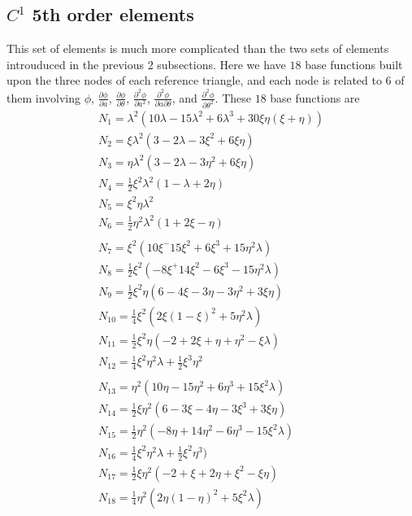 \documentclass{report}
\newcommand{\ff}[2]{\frac{#1}{#2}}
\newcommand{\pp}[2]{\frac{\partial{#1}}{\partial{#2}}}
\newcommand{\psp}[2]{\frac{\partial^2{#1}}{\partial{#2}^2}}
\newcommand{\ppp}[3]{\frac{\partial^2{#1}}{\partial{#2}\partial{#3}}}
\begin{document}
\subsection{$C^1$ 5th order elements}
\label{sec:e5}
This set of elements is much more complicated than the two sets of elements 
introuduced in the previous 2 subsections. Here we have $18$ base functions
built upon the three nodes of each reference triangle,
and each node is related to $6$ of them involving 
$\phi$, 
$\pp{\phi}{a}$,
$\pp{\phi}{\theta}$,
$\psp{\phi}{a}$,
$\ppp{\phi}{a}{\theta}$,
and $\psp{\phi}{\theta}$.
These $18$ base functions are
\begin{equation}
\begin{array}{l}
N_1 = \lambda^2(10\lambda - 15\lambda^2 + 6\lambda^3 + 30\xi\eta(\xi + \eta)) \\
N_2 = \xi \lambda^2(3 - 2\lambda - 3\xi^2  + 6\xi\eta) \\
N_3 = \eta\lambda^2(3 - 2\lambda - 3\eta^2 + 6\xi\eta) \\
N_4 = \ff{1}{2} \xi^2\lambda^2(1 - \lambda + 2\eta) \\
N_5 = \xi^2\eta\lambda^2 \\
N_6 = \ff{1}{2} \eta^2\lambda^2(1 + 2\xi - \eta) \\
\\
N_7 = \xi^2(10\xi^ - 15\xi^2 + 6\xi^3 + 15\eta^2\lambda) \\
N_8 = \ff{1}{2}\xi^2(-8\xi^ + 14\xi^2 - 6\xi^3 - 15\eta^2\lambda) \\
N_9 = \ff{1}{2}\xi^2\eta(6 - 4\xi - 3\eta - 3\eta^2 + 3\xi\eta) \\
N_{10} = \ff{1}{4}\xi^2(2\xi(1 - \xi)^2 + 5\eta^2\lambda) \\
N_{11} = \ff{1}{2}\xi^2\eta(-2 +2\xi + \eta + \eta^2 - \xi\lambda) \\
N_{12} = \ff{1}{4}\xi^2\eta^2\lambda + \ff{1}{2}\xi^3\eta^2\\
\\
N_{13} = \eta^2(10\eta - 15\eta^2 + 6\eta^3 + 15\xi^2\lambda)\\
N_{14} = \ff{1}{2}\xi\eta^2(6 - 3\xi - 4\eta - 3\xi^3 + 3\xi\eta)\\
N_{15} = \ff{1}{2}\eta^2(- 8\eta + 14\eta^2 - 6\eta^3 - 15\xi^2\lambda)\\
N_{16} = \ff{1}{4}\xi^2\eta^2\lambda + \ff{1}{2}\xi^2\eta^3)\\
N_{17} = \ff{1}{2}\xi\eta^2(-2 + \xi + 2\eta + \xi^2 -\xi\eta)\\
N_{18} = \ff{1}{4}\eta^2(2\eta(1-\eta)^2 + 5\xi^2\lambda)\\
\end{array}
\end{equation}
\end{document}
